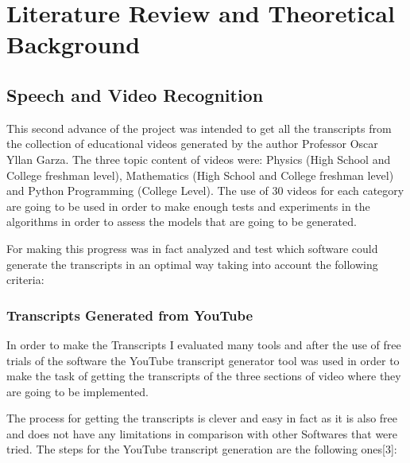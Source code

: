 


\chapter{Literature Review and Theoretical Background }
\label{chapter:chapter02}




















\section*{Speech and Video Recognition}



This second advance of the project was intended to get all the transcripts from the collection of educational videos generated by the author Professor Oscar Yllan Garza. The three topic content of videos were: Physics (High School and College freshman level), Mathematics (High School and College freshman level) and Python Programming (College Level). The use of 30 videos for each category are going to be used in order to make enough tests and experiments in the algorithms in order to assess the models that are going to be generated. 

For making this progress was in fact analyzed and test which software could generate the transcripts in an optimal way taking into account the following criteria:

\subsection*{Transcripts Generated from YouTube}

In order to make the Transcripts I evaluated many tools and after the use of free trials of the software the YouTube transcript generator tool was used in order to make the task of getting the transcripts of the three sections of video where they are going to be implemented.

The process for getting the transcripts is clever and easy in fact as it is also free and does not have any limitations in comparison with other Softwares that were tried. The steps for the YouTube transcript generation are the following ones[3]:

